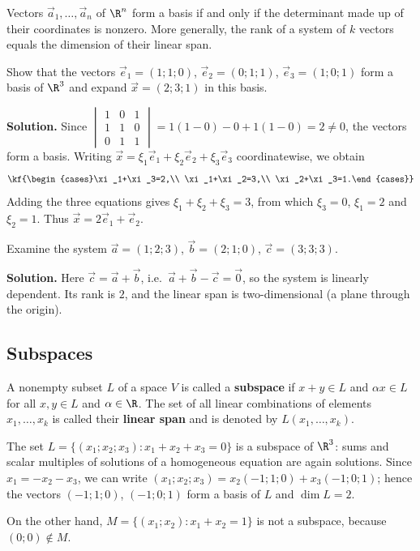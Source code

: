 \begin{teorema}
Vectors $\vec a_1,\dots,\vec a_n$ of $\R^n$ form a basis if and only if the
determinant made up of their coordinates is nonzero. More generally, the rank
of a system of $k$ vectors equals the dimension of their linear span.
\end{teorema}

\begin{misol}
Show that the vectors $\vec e_1=(1;1;0)$, $\vec e_2=(0;1;1)$, $\vec e_3=(1;0;1)$
form a basis of $\R^3$ and expand $\vec x=(2;3;1)$ in this basis.

\textbf{Solution.} Since
$\begin{vmatrix}1&0&1\\1&1&0\\0&1&1\end{vmatrix}=1(1-0)-0+1(1-0)=2\neq0$,
the vectors form a basis. Writing $\vec x=\xi_1\vec e_1+\xi_2\vec e_2+\xi_3\vec e_3$
coordinatewise, we obtain
\[\kf{\begin{cases}\xi_1+\xi_3=2,\\ \xi_1+\xi_2=3,\\ \xi_2+\xi_3=1.\end{cases}}\]
Adding the three equations gives $\xi_1+\xi_2+\xi_3=3$, from which $\xi_3=0$,
$\xi_1=2$ and $\xi_2=1$. Thus $\vec x=2\vec e_1+\vec e_2$.
\end{misol}

\begin{misol}
Examine the system $\vec a=(1;2;3)$, $\vec b=(2;1;0)$, $\vec c=(3;3;3)$.

\textbf{Solution.} Here $\vec c=\vec a+\vec b$, i.e.\ $\vec a+\vec b-\vec c=\vec 0$,
so the system is linearly dependent. Its rank is $2$, and the linear span is
two-dimensional (a plane through the origin).
\end{misol}

\subsection{Subspaces}

\begin{tarif}
A nonempty subset $L$ of a space $V$ is called a \textbf{subspace} if
$x+y\in L$ and $\alpha x\in L$ for all $x,y\in L$ and $\alpha\in\R$.
The set of all linear combinations of elements $x_1,\dots,x_k$ is called their
\textbf{linear span} and is denoted by $L(x_1,\dots,x_k)$.
\end{tarif}

\begin{misol}
The set $L=\{(x_1;x_2;x_3)\colon x_1+x_2+x_3=0\}$ is a subspace of $\R^3$:
sums and scalar multiples of solutions of a homogeneous equation are again
solutions. Since $x_1=-x_2-x_3$, we can write
$(x_1;x_2;x_3)=x_2(-1;1;0)+x_3(-1;0;1)$; hence the vectors
$(-1;1;0)$, $(-1;0;1)$ form a basis of $L$ and $\dim L=2$.

On the other hand, $M=\{(x_1;x_2)\colon x_1+x_2=1\}$ is not a subspace, because
$(0;0)\notin M$.
\end{misol}

